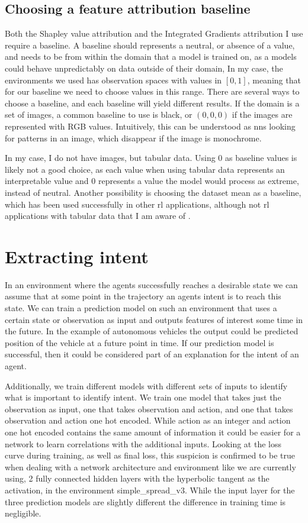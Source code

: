 \documentclass[UKenglish]{uiomasterthesis}
\begin{document}
\subsection{Choosing a feature attribution baseline}
Both the Shapley value attribution and the Integrated Gradients attribution I use require a baseline. A baseline should represents a neutral, or absence of a value, and needs to be from within the domain that a model is trained on, as a models could behave unpredictably on data outside of their domain, In my case, the environments we used has observation spaces with values in $[0,1]$, meaning that for our baseline we need to choose values in this range. There are several ways to choose a baseline, and each baseline will yield different results. If the domain is a set of images, a common baseline to use is black, or $(0,0,0)$ if the images are represented with RGB values\cite{baseline_bird}. Intuitively, this can be understood as \acp{nn} looking for patterns in an image, which disappear if the image is monochrome.

In my case, I do not have images, but tabular data. Using $0$ as baseline values is likely not a good choice, as each value when using tabular data represents an interpretable value and $0$ represents a value the model would process as extreme, instead of neutral. Another possibility is choosing the dataset mean as a baseline, which has been used successfully in other \ac{rl} applications, although not \ac{rl} applications with tabular data that I am aware of \cite{baseline_rl}.


\section{Extracting intent}
\label{sec:intent_meth}
In an environment where the agents successfully reaches a desirable state we can assume that at some point in the trajectory an agents intent is to reach this state. We can train a prediction model on such an environment that uses a certain state or observation as input and outputs features of interest some time in the future. In the example of autonomous vehicles the output could be predicted position of the vehicle at a future point in time. If our prediction model is successful, then it could be considered part of an explanation for the intent of an agent.

Additionally, we train different models with different sets of inputs to identify what is important to identify intent. We train one model that takes just the observation as input, one that takes observation and action, and one that takes observation and action one hot encoded. While action as an integer and action one hot encoded contains the same amount of information it could be easier for a network to learn correlations with the additional inputs. Looking at the loss curve during training, as well as final loss, this suspicion is confirmed to be true when dealing with a network architecture and environment like we are currently using, 2 fully connected hidden layers with the hyperbolic tangent as the activation, in the environment simple\_spread\_v3. While the input layer for the three prediction models are slightly different the difference in training time is negligible. 
\end{document}
